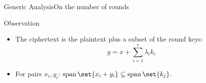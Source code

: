 \begin{frame}{Generic Analysis}{On the number of rounds}
    \vspace{-20pt}
    \begin{minipage}[t][85pt][t]{0.47\textwidth}
        \begin{block}{Observation\vpPp}
            \begin{itemize}
                \item The ciphertext is the plaintext plus a subset of the round keys:
                    \begin{equation*}
                        y = x + \sum_{i=1}^{r} \lambda_i k_i
                    \end{equation*}
                \item For pairs $x_i, y_i$: $\Span \set{x_i + y_i} \subseteq \Span \set{k_j}$.
            \end{itemize}
            \vspace{2pt}
        \end{block}
    \end{minipage}
    \hfill
    \begin{minipage}[t][85pt][t]{0.47\textwidth}
    \end{minipage}

    \vspace{50pt}


\end{frame}
